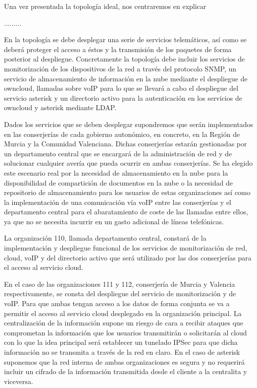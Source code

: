 \documentclass[a4paper]{article}
\begin{document}
\newpage 
 Una vez presentada la topología ideal, nos centraremos en explicar 

.........

 En la topología se debe desplegar una serie de servicios telemáticos, así como se deberá proteger el acceso a éstos y la transmisión de los paquetes de forma posterior al despliegue.  Concretamente la topología debe incluir los servicios de monitorización de los dispositivos de la red a través del protocolo SNMP, un servicio de almacenamiento de información en la nube mediante el despliegue de owncloud, llamadas sobre voIP para
lo que se llevará a cabo el despliegue del servicio asterisk y un directorio activo para la autenticación en los servicios de owncloud y asterisk mediante LDAP.


 Dados los servicios que se deben desplegar supondremos que serán implementados en las conserjerías de cada gobierno autonómico, en concreto, en la Región de Murcia y la Comunidad Valenciana. Dichas conserjerías estarán gestionadas por un departamento central que se encargará de la administración de red y de solucionar cualquier avería que pueda ocurrir en ambas conserjerías. Se ha elegido este escenario real por la necesidad de almacenamiento en la nube para la disponibilidad de compartición de documentos en la nube o la necesidad de repositorio de almacenamiento para los usuarios de estas organizaciones así como la implementación de una comunicación vía voIP entre las conserjerías y el departamento central para el abaratamiento de coste de las llamadas entre ellos, ya que no se necesita
incurrir en un gasto adicional de líneas telefónicas.


 La organización 110, llamada departamento central, constará de la implementación y despliegue funcional de los servicios de monitorización de red, cloud, voIP y del directorio activo que será utilizado por las dos conserjerías para el acceso al servicio cloud.


 En el caso de las organizaciones 111 y 112, conserjería de Murcia y Valencia respectivamente, se consta del despliegue del servicio de monitorización y de voIP. Para que ambas tengan acceso a los datos de forma conjunta se va a permitir el acceso al servicio cloud desplegado en la organización principal. La centralización de la información supone un riesgo de cara a recibir ataques que comprometan la información que los usuarios transmitirán o solicitarán al cloud con lo que la idea principal será establecer un tunelado IPSec para que dicha información no
se transmita a través de la red en claro. En el caso de asterisk suponemos que la red interna de ambas organizaciones es segura y no requerirá incluir un cifrado de la información transmitida desde el cliente a la centralita y viceversa.
\end{document}

